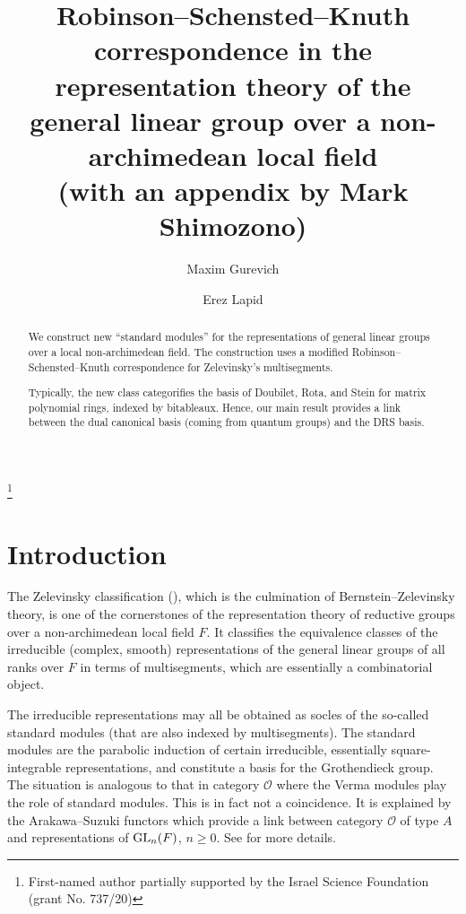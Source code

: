 \documentclass{ert-l} %
\begin{document}
\title[RSK for $\GL_n$ over local fields]{Robinson--Schensted--Knuth correspondence in the representation theory
of the general linear group over a non-archimedean local field\\
(with an appendix by Mark Shimozono)}
\author{Maxim Gurevich}
\address{Department of Mathematics, Technion -- Israel Institute of Technology, Haifa, Israel.}
\thanks{First-named author partially supported by the Israel Science Foundation (grant No. 737/20)}
\author{Erez Lapid}
\address{Department of Mathematics, Weizmann Institute of Science, Rehovot, Israel}


\date{}

\begin{abstract}
We construct new ``standard modules'' for the representations
of general linear groups over a local non-archimedean field.
The construction uses a modified Robinson--Schensted--Knuth correspondence
for Zelevinsky's multisegments.

Typically, the new class categorifies the basis of Doubilet, Rota, and Stein for matrix polynomial rings, indexed by bitableaux.
Hence, our main result provides a link between the dual canonical basis (coming from quantum groups) and the DRS basis.
\end{abstract}

\maketitle

\setcounter{tocdepth}{1}
\tableofcontents


\section{Introduction}
The Zelevinsky classification (\cite{MR584084}), which is the culmination of Bernstein--Zelevinsky theory, is one of the cornerstones of the representation theory of reductive groups over a non-archimedean local field $F$.
It classifies the equivalence classes of the irreducible (complex, smooth) representations of the general linear groups of all ranks over $F$
in terms of multisegments, which are essentially a combinatorial object.

The irreducible representations may all be obtained as socles of the so-called standard modules (that are also indexed by multisegments).
The standard modules are the parabolic induction of certain irreducible, essentially square-integrable representations,
and constitute a basis for the Grothendieck group.
The situation is analogous to that in category $\mathcal{O}$ where the Verma modules play the role of standard modules.
This is in fact not a coincidence. It is explained by the Arakawa--Suzuki functors \cite{MR1652134}
which provide a link between category $\mathcal{O}$ of type $A$ and representations of $\operatorname{GL}_n(F)$, $n\ge0$.
See \cites{MR2320806, MR3495794, MR3866895} for more details.
\end{document}
